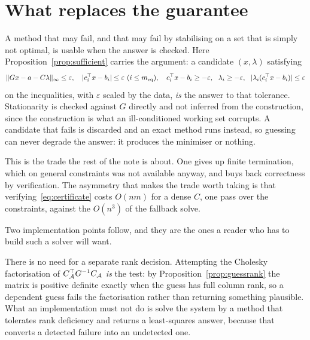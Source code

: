 \section{What replaces the guarantee}
\label{sec:certificate}

A method that may fail, and that may fail by stabilising on a set that is simply
not optimal, is usable when the answer is checked. Here
Proposition~\ref{prop:sufficient} carries the argument: a candidate $(x,\lambda)$
satisfying
\begin{equation}
  \lVert G x - a - C\lambda \rVert_\infty \le \varepsilon,
  \quad |c_i^{\top} x - b_i| \le \varepsilon \ (i \le m_{\mathrm{eq}}),
  \quad c_i^{\top} x - b_i \ge -\varepsilon, \ \ \lambda_i \ge -\varepsilon,
  \ \ |\lambda_i (c_i^{\top} x - b_i)| \le \varepsilon
  \label{eq:certificate}
\end{equation}
on the inequalities, with $\varepsilon$ scaled by the data, \emph{is} the answer
to that tolerance. Stationarity is checked against $G$ directly and not inferred
from the construction, since the construction is what an ill-conditioned working
set corrupts. A candidate that fails is discarded and an exact
method runs instead, so guessing can never degrade the answer: it produces the
minimiser or nothing.

This is the trade the rest of the note is about. One gives up finite termination,
which on general constraints was not available anyway, and buys back correctness
by verification. The asymmetry that makes the trade worth taking is that
verifying~\eqref{eq:certificate} costs $O(nm)$ for a dense $C$, one pass over the
constraints, against the $O(n^3)$ of the fallback solve.

Two implementation points follow, and they are the ones a reader who has to build
such a solver will want.

\begin{remark}
There is no need for a separate rank decision. Attempting the Cholesky
factorisation of $C_{\mathcal{A}}^{\top} G^{-1}C_{\mathcal{A}}$ \emph{is} the test: by
Proposition~\ref{prop:guessrank} the matrix is positive definite exactly when the
guess has full column rank, so a dependent guess fails the factorisation rather
than returning something plausible. What an implementation must not do is solve
the system by a method that tolerates rank deficiency and returns a least-squares
answer, because that converts a detected failure into an undetected one.
\end{remark}


